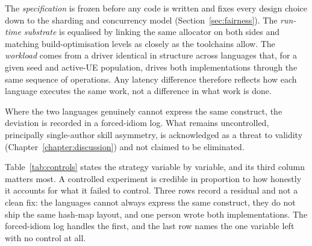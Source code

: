 \documentclass[english,oneside,a4paper,censored,csm,software-track-2020]{HYthesisML}
\begin{document}
The \emph{specification} is frozen before any code is written and fixes every design choice down
to the sharding and concurrency model (Section~\ref{sec:fairness}). The \emph{run-time substrate}
is equalised by linking the
same allocator on both sides and matching build-optimisation levels as closely as the toolchains
allow. The \emph{workload} comes from a driver identical in structure across languages that, for
a given seed and active-UE population, drives both implementations through the same sequence of
operations. Any latency difference therefore reflects how each language executes the same work,
not a difference in what work is done.

Where the two languages genuinely cannot express the same construct, the deviation is recorded
in a forced-idiom log. What remains uncontrolled, principally single-author skill asymmetry, is
acknowledged as a threat to validity (Chapter~\ref{chapter:discussion}) and not claimed to be
eliminated.

Table~\ref{tab:controls} states the strategy variable by variable, and its third column matters
most. A controlled experiment is credible in proportion to how honestly it accounts for what it
failed to control. Three rows record a residual and not a clean fix: the languages cannot
always express the same construct, they do not ship the same hash-map layout, and one person
wrote both implementations. The forced-idiom log handles the first, and the last row names the
one variable left with no control at all.
\end{document}
